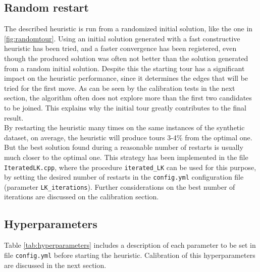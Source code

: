 \subsection{Random restart}
The described heuristic is run from a randomized initial solution, like the one in \cref{fig:randomtour}. Using an initial solution generated with a fast constructive heuristic has been tried, and a faster convergence has been registered, even though the produced solution was often not better than the solution generated from a random initial solution.
Despite this the starting tour has a significant impact on the heuristic performance, since it determines the edges that will be tried for the first move. As can be seen by the calibration tests in the next section, the algorithm often does not explore more than the first two candidates to be joined. This explains why the initial tour greatly contributes to the final result.\\
By restarting the heuristic many times on the same instances of the synthetic dataset, on average, the heuristic will produce tours 3-4\% from the optimal one. But the best solution found during a reasonable number of restarts is usually much closer to the optimal one. This strategy has been implemented in the file \texttt{IteratedLK.cpp}, where the procedure \texttt{iterated\_LK} can be used for this purpose, by setting the desired number of restarts in the \texttt{config.yml} configuration file (parameter \texttt{LK\_iterations}). Further considerations on the best number of iterations are discussed on the calibration section.

\subsection{Hyperparameters}
Table \ref{tab:hyperparameters} includes a description of each parameter to be set in file \texttt{config.yml} before starting the heuristic. Calibration of this hyperparameters are discussed in the next section.


